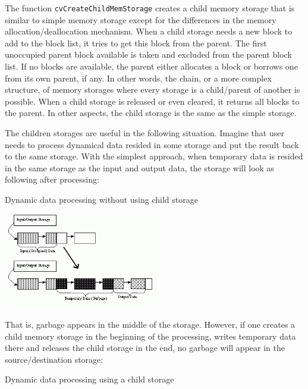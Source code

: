 
\begin{description}
\end{description}


The function \texttt{cvCreateChildMemStorage} creates a child memory
storage that is similar to simple memory storage except for the
differences in the memory allocation/deallocation mechanism. When a
child storage needs a new block to add to the block list, it tries
to get this block from the parent. The first unoccupied parent block
available is taken and excluded from the parent block list. If no blocks
are available, the parent either allocates a block or borrows one from
its own parent, if any. In other words, the chain, or a more complex
structure, of memory storages where every storage is a child/parent of
another is possible. When a child storage is released or even cleared,
it returns all blocks to the parent. In other aspects, the child storage
is the same as the simple storage.

The children storages are useful in the following situation. Imagine
that user needs to process dynamical data resided in some storage and
put the result back to the same storage. With the simplest approach,
when temporary data is resided in the same storage as the input and
output data, the storage will look as following after processing:

Dynamic data processing without using child storage

\includegraphics[width=0.5\textwidth]{pics/memstorage1.png}

That is, garbage appears in the middle of the storage. However, if
one creates a child memory storage in the beginning of the processing,
writes temporary data there and releases the child storage in the end,
no garbage will appear in the source/destination storage:

Dynamic data processing using a child storage

